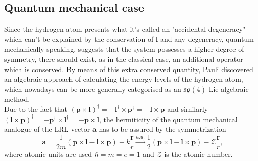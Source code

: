 \documentclass[12pt,a4paper]{report}
\theoremstyle{definition}
\theoremstyle{remark}
\theoremstyle{remark}
\begin{document}
\subsection{Quantum mechanical case}
Since the hydrogen atom presents what it's called an "accidental degeneracy" which can't be explained by the conservation of $\textbf{l}$ and any degeneracy, quantum mechanically speaking, suggests that the system possesses a higher degree of symmetry, there should exist, as in the classical case, an additional operator which is conserved. 
By means of this extra conserved quantity, Pauli discovered an algebraic approach of calculating the energy levels of the hydrogen atom\cite{waerden}, which nowadays can be more generally categorised as an $\mathfrak{so}(4)$ Lie algebraic method. \\ \indent
Due to the fact that $(\textbf{p}\times\textbf{l})^{\dag}=-\textbf{l}^{\dag}\times\textbf{p}^{\dag}=-\textbf{l}\times\textbf{p}$ and similarly $(\textbf{l}\times\textbf{p})^{\dag}=-\textbf{p}^{\dag}\times\textbf{l}^{\dag}=-\textbf{p}\times\textbf{l}$, the hermiticity of the quantum mechanical analogue of the LRL vector $\textbf{a}$ has to be assured by the symmetrization
\begin{equation}\label{eqlrl1}
\textbf{a}=\frac{1}{2m}\left(\textbf{p}\times\textbf{l}-\textbf{l}\times\textbf{p}\right)-k\frac{\textbf{r}}{r} \xrightarrow{a.u.} \frac{1}{2}\left(\textbf{p}\times\textbf{l}-\textbf{l}\times\textbf{p}\right)-\mathcal{Z}\frac{\textbf{r}}{r},
\end{equation}
where atomic units are used $\hbar=m=e=1$ and $\mathcal{Z}$ is the atomic number.
\end{document}

